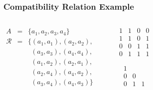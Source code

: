 \documentclass[dvipsnames]{beamer}
\begin{document}
\begin{frame}
  \frametitle{Compatibility Relation Example}

  \begin{example}
    \begin{columns}
      \begin{eqnarray*}
        A           & = & \{a_1,a_2,a_3,a_4\}\\
        \mathcal{R} & = & \{(a_1,a_1),(a_2,a_2),\\
                    &   & ~~(a_3,a_3),(a_4,a_4),\\
                    &   & ~~(a_1,a_2),(a_2,a_1),\\
                    &   & ~~(a_2,a_4),(a_4,a_2),\\
                    &   & ~~(a_3,a_4),(a_4,a_3)\}
      \end{eqnarray*}

      \begin{center}

        \bigskip
      \end{center}

      \pause
      \begin{center}
        \[
          \begin{array}{|cccc|}
            1  &  1  &  0  &  0\\
            1  &  1  &  0  &  1\\
            0  &  0  &  1  &  1\\
            0  &  1  &  1  &  1
          \end{array}
        \]

        \[
          \begin{array}{|ccc|}
            1  &     & \\
            0  &  0  & \\
            0  &  1  &  1
          \end{array}
        \]
      \end{center}
    \end{columns}
  \end{example}
\end{frame}
\end{document}
